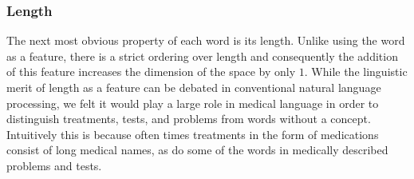 \documentclass[preprint]{style}
\begin{document}
\subsubsection{Length}
The next most obvious property of each word is its length. Unlike using the word as a feature, there is a strict ordering over length and consequently the addition of this feature increases the dimension of the space by only $1$. While the linguistic merit of length as a feature can be debated in conventional natural language processing, we felt it would play a large role in medical language in order to distinguish treatments, tests, and problems from words without a concept. Intuitively this is because often times treatments in the form of medications consist of long medical names, as do some of the words in medically described problems and tests.
\end{document}
